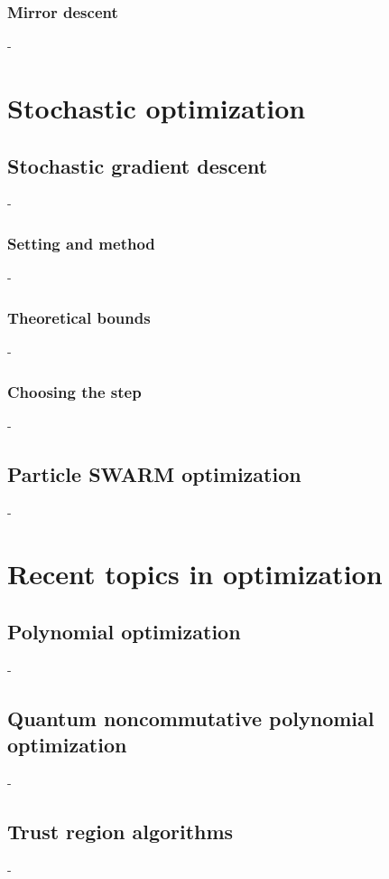 \documentclass[12pt,openany,oneside]{book}
\theoremstyle{definition}
\numberwithin{definition}{section}
\numberwithin{theorem}{section}
\numberwithin{corollary}{section}
\numberwithin{proposition}{section}
\numberwithin{notation}{section}
\numberwithin{remark}{section}
\numberwithin{hypothesis}{section}
\numberwithin{example}{section}
\begin{document}
\subsection{Mirror descent}-

\chapter{Stochastic optimization}

\section{Stochastic gradient descent}-
\subsection{Setting and method}-
\subsection{Theoretical bounds}-
\subsection{Choosing the step}-
\section{Particle SWARM optimization}-

\chapter{Recent topics in optimization}

\section{Polynomial optimization}-
\section{Quantum noncommutative polynomial optimization}-
\section{Trust region algorithms}-
\end{document}
